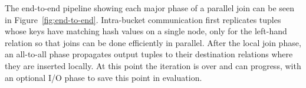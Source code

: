 

The end-to-end pipeline showing each major phase of a parallel join can be seen in Figure~\ref{fig:end-to-end}. Intra-bucket communication first replicates tuples whose keys have matching hash values on a single node, only for the left-hand relation so that joins can be done efficiently in parallel. After the local join phase, an all-to-all phase propagates output tuples to their destination relations where they are inserted locally. At this point the iteration is over and can progress, with an optional I/O phase to save this point in evaluation.
